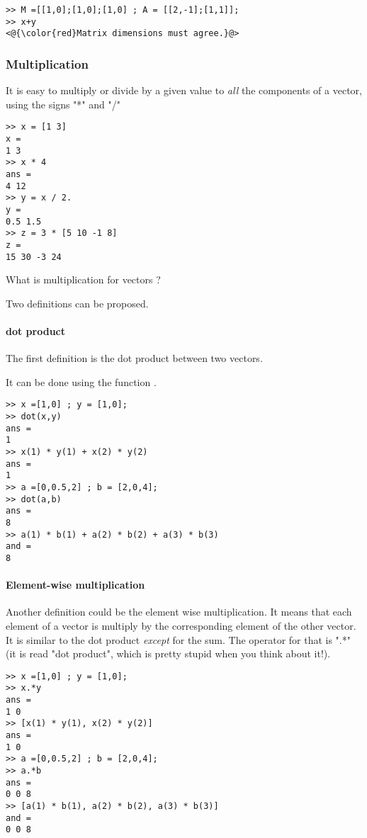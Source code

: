 \begin{lstlisting}
>> M =[[1,0];[1,0];[1,0] ; A = [[2,-1];[1,1]];
>> x+y
<@{\color{red}Matrix dimensions must agree.}@>
\end{lstlisting}



\subsubsection{Multiplication}
It is easy to multiply or divide by a given value to \emph{all} the components of a vector, using the signs "*" and "/"

\begin{lstlisting}
>> x = [1 3]
x = 
1 3
>> x * 4
ans =
4 12
>> y = x / 2.
y =
0.5 1.5
>> z = 3 * [5 10 -1 8]
z = 
15 30 -3 24
\end{lstlisting}

What is multiplication for vectors ?

Two definitions can be proposed.

\paragraph{dot product}
The first definition is the dot product between two vectors.


It can be done using the function .
\begin{lstlisting}
>> x =[1,0] ; y = [1,0];
>> dot(x,y)
ans = 
1
>> x(1) * y(1) + x(2) * y(2)
ans =
1
>> a =[0,0.5,2] ; b = [2,0,4];
>> dot(a,b)
ans = 
8
>> a(1) * b(1) + a(2) * b(2) + a(3) * b(3)    
and =
8
\end{lstlisting}


\paragraph{Element-wise multiplication}
Another definition could be the element wise multiplication.
It means that each element of a vector is multiply by the corresponding element of the other vector.
It is similar to the dot product \emph{except} for the sum.
The operator for that is ".*" (it is read "dot product", which is pretty stupid when you think about it!).

\begin{lstlisting}
>> x =[1,0] ; y = [1,0];
>> x.*y
ans = 
1 0
>> [x(1) * y(1), x(2) * y(2)]
ans =
1 0
>> a =[0,0.5,2] ; b = [2,0,4];
>> a.*b
ans = 
0 0 8
>> [a(1) * b(1), a(2) * b(2), a(3) * b(3)]
and =
0 0 8
\end{lstlisting}



